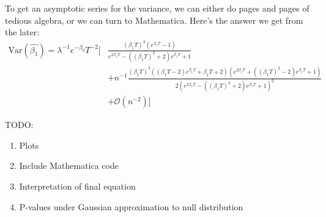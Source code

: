 \documentclass[12pt, letterpaper]{article}
\begin{document}
To get an asymptotic series for the variance, we can either do pages and pages of tedious algebra, or we can turn to Mathematica.
Here's the answer we get from the later:
\newcommand{\bt}{\beta_1 T}
\newcommand{\ebt}[1][]{e^{#1 \beta_1 T}}
\begin{equation}
\begin{split}
    \textrm{Var}(\hat{\beta_1}) = \lambda^{-1} e^{-\beta_0} T^{-2}
    \biggl[
    &\frac
        {{(\bt)}^3 \left( \ebt - 1 \right)}
        {\ebt[2] - ({(\bt)}^2 + 2)\ebt + 1} \\
    &+ n^{-1}
    \frac
    {{(\bt)}^3 \left(\left(\bt - 2\right) \ebt + \bt + 2 \right)\left(\ebt[2] + ({(\bt)}^2 - 2)\ebt + 1\right)}
        {2{\left(\ebt[2] -({(\bt)}^2 + 2)\ebt + 1\right)}^2}\\
    &+ \mathcal{O}(n^{-2})
    \biggr]
\end{split}
\end{equation}

TODO:
\begin{enumerate}
    \item Plots
    \item Include Mathematica code
    \item Interpretation of final equation
    \item P-values under Gaussian approximation to null distribution
\end{enumerate}
\end{document}
